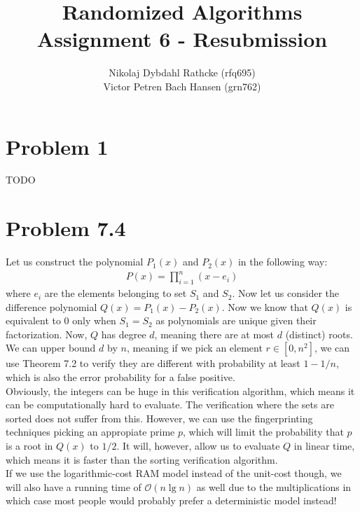 \documentclass[a4paper, fleqn]{article}
\author{Nikolaj Dybdahl Rathcke (rfq695) \\ Victor Petren Bach Hansen (grn762)}
\title{Randomized Algorithms \\ Assignment 6 - Resubmission}
\begin{document}
\maketitle

\section*{Problem 1}
TODO

\section*{Problem 7.4}
Let us construct the polynomial $P_1(x)$ and $P_2(x)$ in the following way:
\begin{align*}
P(x) = \prod_{i=1}^n (x-e_i)
\end{align*}
where $e_i$ are the elements belonging to set $S_1$ and $S_2$. Now let us consider the difference polynomial $Q(x)=P_1(x)-P_2(x)$. Now we know that $Q(x)$ is equivalent to $0$ only when $S_1=S_2$ as polynomials are unique given their factorization. Now, $Q$ has degree $d$, meaning there are at most $d$ (distinct) roots. We can upper bound $d$ by $n$, meaning if we pick an element $r\in [0, n^2]$, we can use Theorem 7.2 to verify they are different with probability at least $1-1/n$, which is also the error probability for a false positive.\\
Obviously, the integers can be huge in this verification algorithm, which means it can be computationally hard to evaluate. The verification where the sets are sorted does not suffer from this. However, we can use the fingerprinting techniques picking an appropiate prime $p$, which will limit the probability that $p$ is a root in $Q(x)$ to $1/2$. It will, however, allow us to evaluate $Q$ in linear time, which means it is faster than the sorting verification algorithm.\\
If we use the logarithmic-cost RAM model instead of the unit-cost though, we will also have a running time of $\mathcal{O}(n\lg n)$ as well due to the multiplications in which case most people would probably prefer a deterministic model instead!
\end{document}
